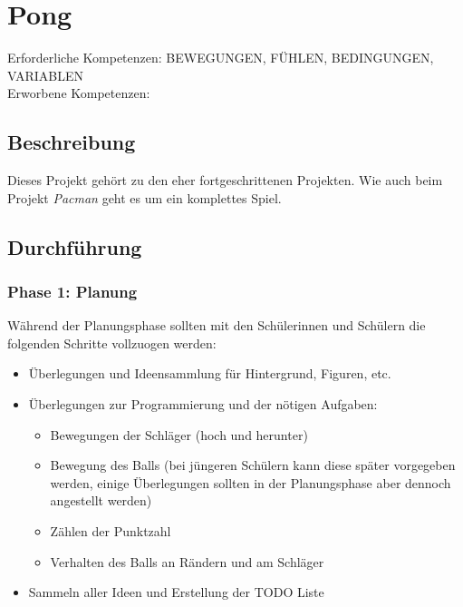 \section{Pong}\label{pong}

Erforderliche Kompetenzen: BEWEGUNGEN, FÜHLEN, BEDINGUNGEN, VARIABLEN\\
Erworbene Kompetenzen:

\begin{figure}[ht]
    \centering 
    \caption[\Sectionname]{\Sectionname}
\end{figure}

\subsection{Beschreibung}\label{beschreibung}

Dieses Projekt gehört zu den eher fortgeschrittenen Projekten. Wie auch
beim Projekt \emph{Pacman} geht es um ein komplettes Spiel.

\subsection{Durchführung}\label{durchfuxfchrung}

\subsubsection{Phase 1: Planung}\label{phase-1-planung}

Während der Planungsphase sollten mit den Schülerinnen und Schülern die
folgenden Schritte vollzuogen werden:

\begin{itemize}
\item
  Überlegungen und Ideensammlung für Hintergrund, Figuren, etc.
\item
  Überlegungen zur Programmierung und der nötigen Aufgaben:

  \begin{itemize}
  \item
    Bewegungen der Schläger (hoch und herunter)
  \item
    Bewegung des Balls (bei jüngeren Schülern kann diese später
    vorgegeben werden, einige Überlegungen sollten in der Planungsphase
    aber dennoch angestellt werden)
  \item
    Zählen der Punktzahl
  \item
    Verhalten des Balls an Rändern und am Schläger
  \end{itemize}
\item
  Sammeln aller Ideen und Erstellung der TODO Liste
\end{itemize}

